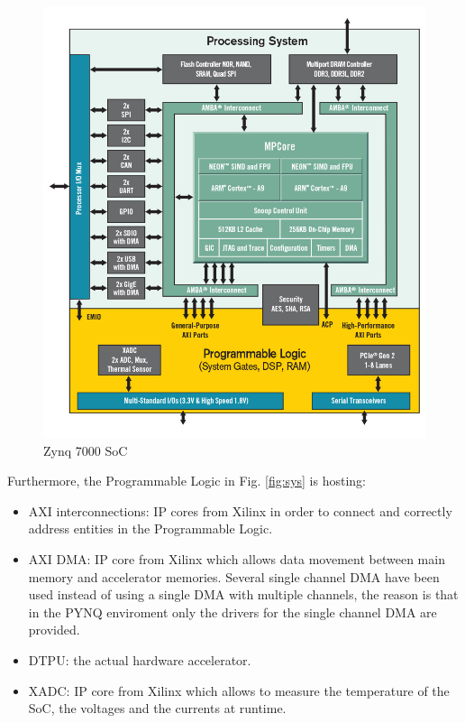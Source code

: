 \begin{figure}[!htbp]
\centering
\captionsetup{justification=centering}
\includegraphics[scale=0.35]{./figure/zynq.PNG}
\caption{Zynq 7000 SoC\cite{paper:42}}
\label{fig:zynq}
\end{figure}

Furthermore, the Programmable Logic in Fig. \ref{fig:sys} is hosting:
\begin{itemize}
\item AXI interconnections: IP cores from Xilinx\cite{paper:34}\cite{paper:35} in order to connect and correctly address entities in the Programmable Logic.
\item AXI DMA: IP core from Xilinx \cite{paper:33} which allows data movement between main memory and accelerator memories.  Several single channel DMA have been used instead of using a single DMA with multiple channels, the reason is that in the PYNQ enviroment only the drivers for the single channel DMA are provided. 
\item DTPU: the actual hardware accelerator.
\item XADC: IP core from Xilinx \cite{paper:32} which allows to measure the temperature of the SoC, the voltages and the currents at runtime.

\end{itemize}

